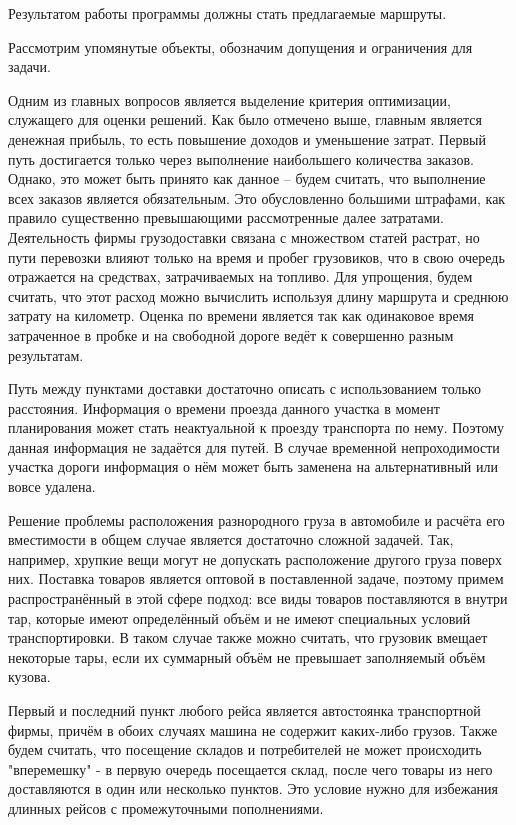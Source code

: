 	Результатом работы программы должны стать предлагаемые маршруты.
	
	Рассмотрим упомянутые объекты, обозначим допущения и ограничения для задачи.
	
	Одним из главных вопросов является выделение критерия оптимизации, служащего для оценки решений. Как было отмечено выше, главным является денежная прибыль, то есть повышение доходов и уменьшение затрат.   
	Первый путь достигается только через выполнение наибольшего количества заказов. Однако, это может быть принято как данное -- будем считать, что выполнение всех заказов является обязательным. Это обусловленно большими штрафами, как правило существенно превышающими рассмотренные далее затратами.   
	Деятельность фирмы грузодоставки связана с множеством статей растрат, но пути перевозки влияют только на время и пробег грузовиков, что в свою очередь отражается на средствах, затрачиваемых на топливо. Для упрощения, будем считать, что этот расход можно вычислить используя длину маршрута и среднюю затрату на километр. Оценка по времени является так как одинаковое время затраченное в пробке и на свободной дороге ведёт к совершенно разным результатам.
	
	Путь между пунктами доставки достаточно описать с использованием только расстояния. Информация о времени проезда данного участка в момент планирования может стать неактуальной к проезду транспорта по нему. Поэтому данная информация не задаётся для путей. В случае временной непроходимости участка дороги информация о нём может быть заменена на альтернативный или вовсе удалена.
	
	Решение проблемы расположения разнородного груза в автомобиле и расчёта его вместимости в общем случае является достаточно сложной задачей. Так, например, хрупкие вещи могут не допускать расположение другого груза поверх них. Поставка товаров является оптовой в поставленной задаче, поэтому примем распространённый в этой сфере подход: все виды товаров поставляются в внутри тар, которые имеют определённый объём и не имеют специальных условий транспортировки. В таком случае также можно считать, что грузовик вмещает некоторые тары, если их суммарный объём не превышает заполняемый объём кузова.
	
	Первый и последний пункт любого рейса является автостоянка транспортной фирмы, причём в обоих случаях машина не содержит каких-либо грузов. Также будем считать, что посещение складов и потребителей не может происходить "вперемешку" - в первую очередь посещается склад, после чего товары из него доставляются в один или несколько пунктов. Это условие нужно для избежания длинных рейсов с промежуточными пополнениями.

